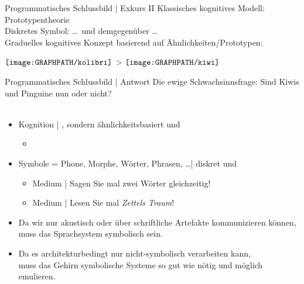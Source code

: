 \begin{frame}
  {Programmatisches Schlussbild | Exkurs II}
  \onslide<+->
  \onslide<+->
  Klassisches kognitives Modell: \alert{Prototypentheorie} \\
  \onslide<+->
  \Zeile
  \alert{Diskretes Symbol}:  \onslide<+-> \ldots\ und demgegenüber \ldots\\
  \onslide<+->
  \alert{Graduelles kognitives Konzept} basierend auf Ähnlichkeiten\slash Prototypen:\\
  \onslide<+->
  \Halbzeile
  \begin{minipage}{0.9\textwidth}
  \centering
    $\vcenter{\hbox{\texttt{[image: \\GRAPHPATH/kolibri]}}}$
    \onslide<+->
    \hspace*{0.025\textwidth}>\hspace*{0.025\textwidth}
    $\vcenter{\hbox{\texttt{[image: \\GRAPHPATH/kiwi]}}}$
  \end{minipage}
\end{frame}

\begin{frame}
  {Programmatisches Schlussbild | Antwort}
  \onslide<+->
  \onslide<+->
  Die ewige Schwachsinnsfrage: Sind Kiwis und Pinguine nun  oder nicht?\\
  \Viertelzeile
  \\
  \Zeile
  \begin{itemize}[<+->]
    \item \alert{Kognition} | , sondern ähnlichkeitsbasiert und 
      \begin{itemize}[<+->]
        \item {}
      \end{itemize}
      \Halbzeile
    \item \alert{Symbole} = Phone, Morphe, Wörter, Phrasen, \ldots |  diskret und 
      \begin{itemize}[<+->]
        \item {} Medium | Sagen Sie mal zwei Wörter gleichzeitig!
        \item {} Medium | Lesen Sie mal \textit{Zettels Traum}!
      \end{itemize}
    \Halbzeile
    \item[\ding{222}] Da wir nur akustisch oder über schriftliche Artefakte kommunizieren können,\\
      \alert{muss das Sprachsystem symbolisch sein}.
    \item[\ding{222}] Da es architekturbedingt nur nicht-symbolisch verarbeiten kann,\\
      \alert{muss das Gehirn symbolische Systeme so gut wie nötig und möglich emulieren}.
  \end{itemize}
\end{frame}


